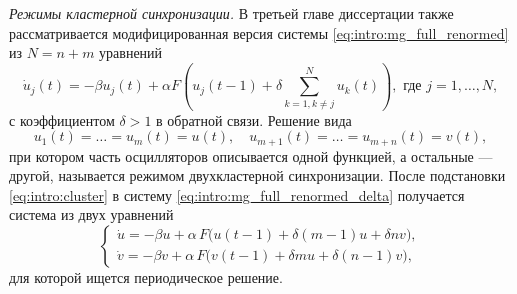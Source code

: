 %
%

\textit{Режимы кластерной синхронизации.} 
В третьей главе диссертации также рассматривается модифицированная версия системы \eqref{eq:intro:mg_full_renormed} из $N = n + m$ уравнений
\begin{equation}
	\label{eq:intro:mg_full_renormed_delta}
	\dot{u}_j(t) = -\beta u_j(t) + \alpha F \left(u_j(t - 1) + \delta\sum\limits_{k = 1, k\neq j}^N u_k(t)\right), \text{ где } j = 1, \dots, N,
\end{equation}
с коэффициентом $\delta > 1$ в обратной связи. Решение вида 
\begin{equation}
	\label{eq:intro:cluster}
	u_1(t)=\ldots=u_m(t) = u(t),\quad u_{m+1}(t)=\ldots=u_{m+n}(t) = v(t),
\end{equation}
при котором часть осцилляторов описывается одной функцией, а остальные --- другой, называется режимом двухкластерной синхронизации. После подстановки \eqref{eq:intro:cluster} в систему \eqref{eq:intro:mg_full_renormed_delta} получается система из двух уравнений
%
\begin{equation}
	\label{eq:intro:system_uv}
	\begin{cases}
		\dot{u} = -\beta u + \alpha \, F \big(u(t - 1) + \delta (m - 1) u + \delta n v\big),\\
		\dot{v} = -\beta v + \alpha \, F \big(v(t - 1) + \delta m u + \delta (n - 1) v\big),
	\end{cases}
\end{equation}
%
для которой ищется периодическое решение.

